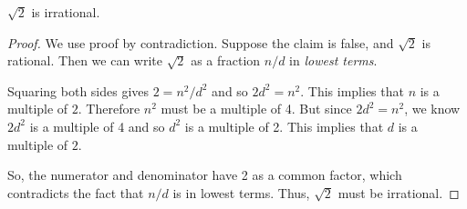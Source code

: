 \begin{theorem}\label{thm:sqrt2irr_by_contra}
$\sqrt{2}$ is irrational.
\end{theorem}

\begin{proof}
We use proof by contradiction.  Suppose the claim is false, and
$\sqrt{2}$ is rational.  Then we can write $\sqrt{2}$ as a fraction
$n/d$ in \textit{lowest terms}.

Squaring both sides gives $2 = n^2 / d^2$ and so $2 d^2 = n^2$.  This
implies that $n$ is a multiple of $2$.  Therefore $n^2$ must be a multiple
of 4.  But since $2d^2 = n^2$, we know $2 d^2$ is a multiple of 4 and so
$d^2$ is a multiple of 2.  This implies that $d$ is a multiple of $2$.

So, the numerator and denominator have 2 as a common factor, which
contradicts the fact that $n/d$ is in lowest terms. Thus, $\sqrt{2}$ must be
irrational.
\end{proof}

